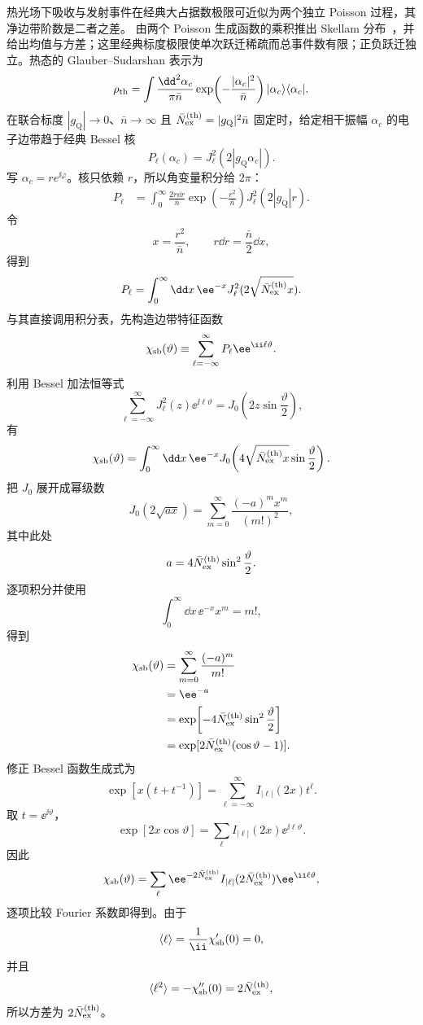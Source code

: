 \begin{exbox}[光子统计反演与电子后选择条件操作]
热光场下吸收与发射事件在经典大占据数极限可近似为两个独立 Poisson 过程，其净边带阶数是二者之差。 由两个 Poisson 生成函数的乘积推出 Skellam 分布~，并给出均值与方差；这里经典标度极限使单次跃迁稀疏而总事件数有限；正负跃迁独立。热态的 Glauber--Sudarshan 表示为
\[
\rho_{\rm th}
=\int\frac{\dd^2 \alpha_c}{\pi\bar n}
\exp\!\left(-\frac{|\alpha_c|^2}{\bar n}\right)
|\alpha_c\rangle\langle\alpha_c|.
\]
在联合标度 $|g_{\mathrm Q}|\to0$、$\bar n\to\infty$ 且 $\bar N_{\rm ex}^{(\rm th)}=|g_{\mathrm Q}|^2\bar n$ 固定时，给定相干振幅 $\alpha_c$ 的电子边带趋于经典 Bessel 核
\[
P_\ell(\alpha_c)=J_\ell^2(2|g_{\mathrm Q}\alpha_c|).
\]
写 $\alpha_c=re^{\ii\varphi}$。核只依赖 $r$，所以角变量积分给 $2\pi$：
\begin{align*}
P_\ell
&=\int_0^\infty\frac{2r\dd r}{\bar n}
\exp\!\left(-\frac{r^2}{\bar n}\right)
J_\ell^2(2|g_{\mathrm Q}|r).
\end{align*}
令
\[
x=\frac{r^2}{\bar n},
\qquad
r\dd r=\frac{\bar n}{2}\dd x,
\]
得到
\[
P_\ell
=\int_0^\infty\dd x\,\ee^{-x}
J_\ell^2(2\sqrt{\bar N_{\rm ex}^{(\rm th)}x}).
\]
与其直接调用积分表，先构造边带特征函数
\[
\chi_{\rm sb}(\vartheta)
\equiv\sum_{\ell=-\infty}^{\infty}
P_\ell\ee^{\ii\ell\vartheta}.
\]
利用 Bessel 加法恒等式
\[
\sum_{\ell=-\infty}^{\infty}
J_\ell^2(z)\ee^{\ii\ell\vartheta}
=J_0\!\left(2z\sin\frac{\vartheta}{2}\right),
\]
有
\[
\chi_{\rm sb}(\vartheta)
=\int_0^\infty\dd x\,\ee^{-x}
J_0\!\left(4\sqrt{\bar N_{\rm ex}^{(\rm th)}x}\sin\frac{\vartheta}{2}\right).
\]
把 $J_0$ 展开成幂级数
\[
J_0(2\sqrt{ax})
=\sum_{m=0}^\infty
\frac{(-a)^m x^m}{(m!)^2},
\]
其中此处
\[
a=4\bar N_{\rm ex}^{(\rm th)}\sin^2\frac{\vartheta}{2}.
\]
逐项积分并使用
\[
\int_0^\infty\dd x\,\ee^{-x}x^m=m!,
\]
得到
\begin{align*}
\chi_{\rm sb}(\vartheta)
&=\sum_{m=0}^\infty\frac{(-a)^m}{m!}\\
&=\ee^{-a}\\
&=\exp\!\left[-4\bar N_{\rm ex}^{(\rm th)}\sin^2\frac{\vartheta}{2}\right]\\
&=\exp[2\bar N_{\rm ex}^{(\rm th)}(\cos\vartheta-1)].
\end{align*}
修正 Bessel 函数生成式为
\[
\exp[x(t+t^{-1})]
=\sum_{\ell=-\infty}^{\infty}I_{|\ell|}(2x)t^\ell.
\]
取 $t=\ee^{\ii\vartheta}$，
\[
\exp[2x\cos\vartheta]
=\sum_\ell I_{|\ell|}(2x)\ee^{\ii\ell\vartheta}.
\]
因此
\[
\chi_{\rm sb}(\vartheta)
=\sum_\ell
\ee^{-2\bar N_{\rm ex}^{(\rm th)}}I_{|\ell|}(2\bar N_{\rm ex}^{(\rm th)})
\ee^{\ii\ell\vartheta},
\]
逐项比较 Fourier 系数即得到。由于
\[
\langle\ell\rangle
=\frac1{\ii}\chi_{\rm sb}'(0)=0,
\]
并且
\[
\langle\ell^2\rangle
=-\chi_{\rm sb}''(0)=2\bar N_{\rm ex}^{(\rm th)},
\]
所以方差为 $2\bar N_{\rm ex}^{(\rm th)}$。


\end{exbox}
